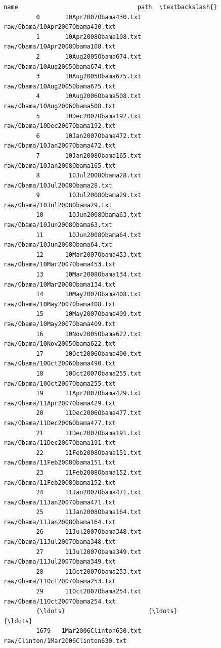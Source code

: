 \documentclass[11pt]{article}
\begin{document}
\begin{Verbatim}[commandchars=\\\{\}]
                                  name                                 path  \textbackslash{}
         0       10Apr2007Obama430.txt      raw/Obama/10Apr2007Obama430.txt   
         1       10Apr2008Obama108.txt      raw/Obama/10Apr2008Obama108.txt   
         2       10Aug2005Obama674.txt      raw/Obama/10Aug2005Obama674.txt   
         3       10Aug2005Obama675.txt      raw/Obama/10Aug2005Obama675.txt   
         4       10Aug2006Obama508.txt      raw/Obama/10Aug2006Obama508.txt   
         5       10Dec2007Obama192.txt      raw/Obama/10Dec2007Obama192.txt   
         6       10Jan2007Obama472.txt      raw/Obama/10Jan2007Obama472.txt   
         7       10Jan2008Obama165.txt      raw/Obama/10Jan2008Obama165.txt   
         8        10Jul2008Obama28.txt       raw/Obama/10Jul2008Obama28.txt   
         9        10Jul2008Obama29.txt       raw/Obama/10Jul2008Obama29.txt   
         10       10Jun2008Obama63.txt       raw/Obama/10Jun2008Obama63.txt   
         11       10Jun2008Obama64.txt       raw/Obama/10Jun2008Obama64.txt   
         12      10Mar2007Obama453.txt      raw/Obama/10Mar2007Obama453.txt   
         13      10Mar2008Obama134.txt      raw/Obama/10Mar2008Obama134.txt   
         14      10May2007Obama408.txt      raw/Obama/10May2007Obama408.txt   
         15      10May2007Obama409.txt      raw/Obama/10May2007Obama409.txt   
         16      10Nov2005Obama622.txt      raw/Obama/10Nov2005Obama622.txt   
         17      10Oct2006Obama490.txt      raw/Obama/10Oct2006Obama490.txt   
         18      10Oct2007Obama255.txt      raw/Obama/10Oct2007Obama255.txt   
         19      11Apr2007Obama429.txt      raw/Obama/11Apr2007Obama429.txt   
         20      11Dec2006Obama477.txt      raw/Obama/11Dec2006Obama477.txt   
         21      11Dec2007Obama191.txt      raw/Obama/11Dec2007Obama191.txt   
         22      11Feb2008Obama151.txt      raw/Obama/11Feb2008Obama151.txt   
         23      11Feb2008Obama152.txt      raw/Obama/11Feb2008Obama152.txt   
         24      11Jan2007Obama471.txt      raw/Obama/11Jan2007Obama471.txt   
         25      11Jan2008Obama164.txt      raw/Obama/11Jan2008Obama164.txt   
         26      11Jul2007Obama348.txt      raw/Obama/11Jul2007Obama348.txt   
         27      11Jul2007Obama349.txt      raw/Obama/11Jul2007Obama349.txt   
         28      11Oct2007Obama253.txt      raw/Obama/11Oct2007Obama253.txt   
         29      11Oct2007Obama254.txt      raw/Obama/11Oct2007Obama254.txt   
         {\ldots}                       {\ldots}                                  {\ldots}   
         1679   1Mar2006Clinton630.txt   raw/Clinton/1Mar2006Clinton630.txt   

\end{Verbatim}
\end{document}
